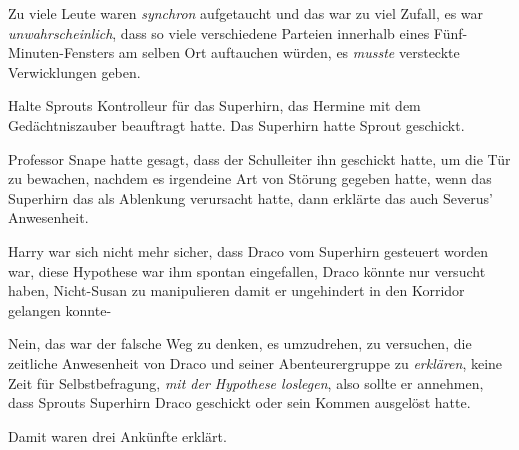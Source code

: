 Zu viele Leute waren \emph{synchron} aufgetaucht und das war zu viel Zufall, es war \emph{unwahrscheinlich}, dass so viele verschiedene Parteien innerhalb eines Fünf-Minuten-Fensters am selben Ort auftauchen würden, es \emph{musste} versteckte Verwicklungen geben.

Halte Sprouts Kontrolleur für das Superhirn, das Hermine mit dem Gedächtniszauber beauftragt hatte. Das Superhirn hatte Sprout geschickt.

Professor Snape hatte gesagt, dass der Schulleiter ihn geschickt hatte, um die Tür zu bewachen, nachdem es irgendeine Art von Störung gegeben hatte, wenn das Superhirn das als Ablenkung verursacht hatte, dann erklärte das auch Severus' Anwesenheit.

Harry war sich nicht mehr sicher, dass Draco vom Superhirn gesteuert worden war, diese Hypothese war ihm spontan eingefallen, Draco könnte nur versucht haben, Nicht-Susan zu manipulieren damit er ungehindert in den Korridor gelangen konnte-

Nein, das war der falsche Weg zu denken, es umzudrehen, zu versuchen, die zeitliche Anwesenheit von Draco und seiner Abenteurergruppe zu \emph{erklären}, keine Zeit für Selbstbefragung, \emph{mit der Hypothese loslegen}, also sollte er annehmen, dass Sprouts Superhirn Draco geschickt oder sein Kommen ausgelöst hatte.

Damit waren drei Ankünfte erklärt.

